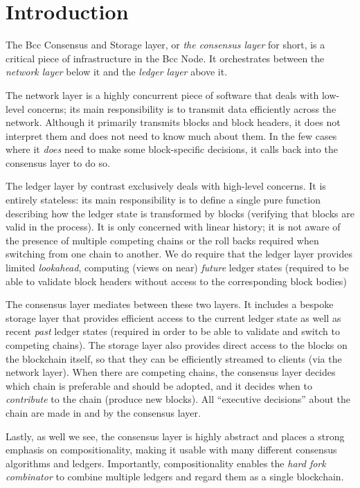 \chapter{Introduction}

The Bcc Consensus and Storage layer, or \emph{the consensus layer} for
short, is a critical piece of infrastructure in the Bcc Node. It
orchestrates between the \emph{network layer} below it and the
\emph{ledger layer} above it.

The network layer is a highly concurrent piece of software that deals with
low-level concerns; its main responsibility is to transmit data efficiently
across the network. Although it primarily transmits blocks and block headers, it
does not interpret them and does not need to know much about them. In the few
cases where it \emph{does} need to make some block-specific decisions, it
calls back into the consensus layer to do so.

The ledger layer by contrast exclusively deals with high-level concerns. It is
entirely stateless: its main responsibility is to define a single pure
function describing how the ledger state is transformed by blocks (verifying
that blocks are valid in the process). It is only concerned with linear history;
it is not aware of the presence of multiple competing chains or the roll backs
required when switching from one chain to another. We do require that the ledger
layer provides limited \emph{lookahead}, computing (views on near)
\emph{future} ledger states (required to be able to validate block headers
without access to the corresponding block bodies)

The consensus layer mediates between these two layers. It includes a
bespoke storage layer that provides efficient access to the current ledger state
as well as recent \emph{past} ledger states (required in order to be able
to validate and switch to competing chains). The storage layer also
provides direct access to the blocks on the blockchain itself, so that they can
be efficiently streamed to clients (via the network layer). When there are
competing chains, the consensus layer decides which chain is preferable and
should be adopted, and it decides when to \emph{contribute} to the chain
(produce new blocks). All ``executive decisions'' about the chain are made in
and by the consensus layer.

Lastly, as well we see, the consensus layer is highly abstract and places a
strong emphasis on compositionality, making it usable with many different
consensus algorithms and ledgers. Importantly, compositionality enables the
\emph{hard fork combinator} to combine multiple ledgers and regard them as a
single blockchain.


